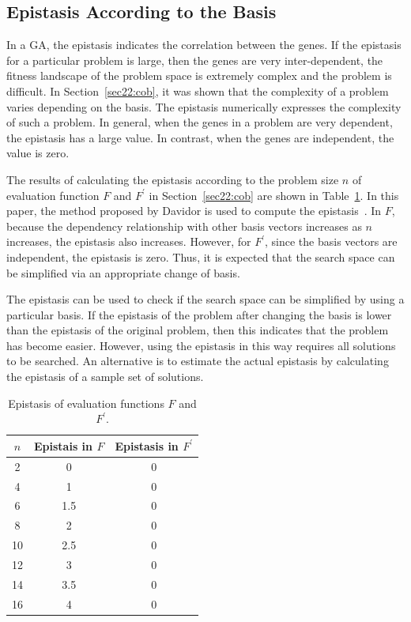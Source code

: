 \subsection{Epistasis According to the Basis}
In a GA, the epistasis indicates the correlation between the genes. If the epistasis for a particular problem is large, then the genes are very inter-dependent, the fitness landscape of the problem space is extremely complex and the problem is difficult. In Section~\ref{sec22:cob}, it was shown that the complexity of a problem varies depending on the basis. The epistasis numerically expresses the complexity of such a problem. In general, when the genes in a problem are very dependent, the epistasis has a large value. In contrast, when the genes are independent, the value is zero.

The results of calculating the epistasis according to the problem size $ n $ of evaluation function $ F $ and $ F^\prime $ in Section~\ref{sec22:cob} are shown in Table~\ref{tab:epi_func}. In this paper, the method proposed by Davidor is used to compute the epistasis~\cite{kim2008effect}. In $ F $, because the dependency relationship with other basis vectors increases as $ n $ increases, the epistasis also increases. However, for $ F^\prime $, since the basis vectors are independent, the epistasis is zero. Thus, it is expected that the search space can be simplified via an appropriate change of basis.

The epistasis can be used to check if the search space can be simplified by using a particular basis. If the epistasis of the problem after changing the basis is lower than the epistasis of the original problem, then this indicates that the problem has become easier. However, using the epistasis in this way requires all solutions to be searched. An alternative is to estimate the actual epistasis by calculating the epistasis of a sample set of solutions.

\begin{table}
	\caption{Epistasis of evaluation functions $ F $ and $ F^\prime $.} \label{tab:epi_func}
	\vspace*{0.2cm}
	\centering
	\begin{tabular}{ccc}
		\toprule
	$ n $ & Epistais in $ F $ & Epistasis in $ F^\prime $   \\ 
	\midrule
	2&  0& 0   \\
	4&  1&  0  \\
	6&  1.5& 0  \\
	8&  2& 0  \\
	10&  2.5& 0  \\
	12&  3& 0  \\
	14&  3.5& 0  \\
	16&  4& 0\\
	\bottomrule
	\end{tabular}
\end{table}

